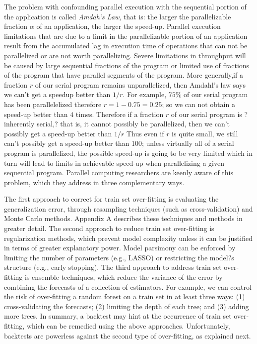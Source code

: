 \documentclass[10pt]{article}[draft]
\begin{document}
\begin{itemize}
	The problem with confounding parallel execution with the sequential portion of the application  is called \emph{Amdah's Law}, that is: the larger the parallelizable fraction $\alpha$ of an application, the larger the speed-up. Parallel execution limitations that are due to a limit in the parallelizable portion of an application result from the accumulated lag in execution time of operations that can not be parallelized or are not worth parallelizing.  Severe limitations in throughput will be caused by large sequential fractions of the program or limited use of fractions of the program that have  parallel segments of the program. More generally,if a fraction $r$ of our serial program remains unparallelized, then Amdahl's law says we can't get a speedup better than $1/r$. For example, $75\%$ of our serial program has been parallelelized therefore $r = 1 - 0.75 = 0.25$; so we can not obtain a speed-up better than $4$ times. Therefore if a fraction $r$ of our serial program is ?inherently serial,? that is, it cannot possibly be parallelized, then we can't possibly get a speed-up better than $1/r$ Thus even if $r$ is quite small, we still can't possibly get a speed-up better than 100; unless virtually all of a serial program is parallelized, the possible speed-up is going to be very limited  which in turn will lead to limits in achievable speed-up when parallelizing a given sequential program. Parallel computing researchers are keenly aware of this problem, which they address in three complementary ways. 
	
	The first approach to correct for train set over-fitting is evaluating the generalization error, through resampling techniques (such as cross-validation) and Monte Carlo methods. Appendix A describes these techniques and methods in greater detail. The second approach to reduce train set over-fitting is regularization methods, which prevent model complexity unless it can be justified in terms of greater explanatory power. Model parsimony can be enforced by limiting the number of parameters (e.g., LASSO) or restricting the model?s structure (e.g., early stopping). The third approach to address train set over-fitting is ensemble techniques, which reduce the variance of the error by combining the forecasts of a collection of estimators. For example, we can control the risk of over-fitting a random forest on a train set in at least three ways: (1) cross-validating the forecasts; (2) limiting the depth of each tree; and (3) adding more trees.
		In summary, a backtest may hint at the occurrence of train set over-fitting, which can be remedied using the above approaches. Unfortunately, backtests are powerless against the second type of over-fitting, as explained next.
		

\end{itemize}
\end{document}
